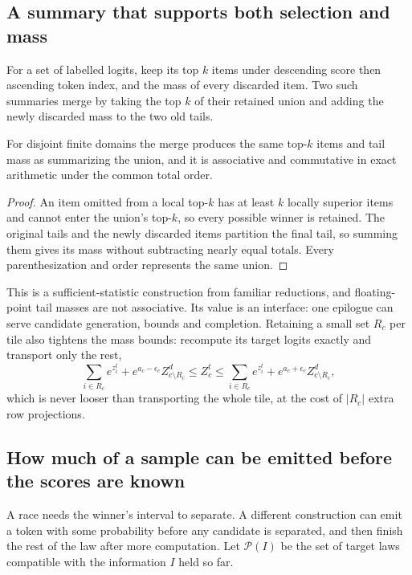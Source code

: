 \subsection{A summary that supports both selection and mass}\label{app:summary}
For a set of labelled logits, keep its top $k$ items under descending score then ascending token index, and the mass of every discarded item. Two such summaries merge by taking the top $k$ of their retained union and adding the newly discarded mass to the two old tails.

\begin{proposition}\label{prop:summary}
For disjoint finite domains the merge produces the same top-$k$ items and tail mass as summarizing the union, and it is associative and commutative in exact arithmetic under the common total order.
\end{proposition}
\begin{proof}
An item omitted from a local top-$k$ has at least $k$ locally superior items and cannot enter the union's top-$k$, so every possible winner is retained. The original tails and the newly discarded items partition the final tail, so summing them gives its mass without subtracting nearly equal totals. Every parenthesization and order represents the same union.
\end{proof}
This is a sufficient-statistic construction from familiar reductions, and floating-point tail masses are not associative. Its value is an interface: one epilogue can serve candidate generation, bounds and completion. Retaining a small set $R_c$ per tile also tightens the mass bounds: recompute its target logits exactly and transport only the rest,
\begin{equation}
\sum_{i\in R_c}e^{z_i^t}+e^{a_c-\epsilon_c}Z^d_{c\setminus R_c}\le Z_c^t\le\sum_{i\in R_c}e^{z_i^t}+e^{a_c+\epsilon_c}Z^d_{c\setminus R_c},\label{eq:tail}
\end{equation}
which is never looser than transporting the whole tile, at the cost of $|R_c|$ extra row projections.

\subsection{How much of a sample can be emitted before the scores are known}\label{sec:commonmass}
A race needs the winner's interval to separate. A different construction can emit a token with some probability before any candidate is separated, and then finish the rest of the law after more computation. Let $\mathcal P(I)$ be the set of target laws compatible with the information $I$ held so far.

